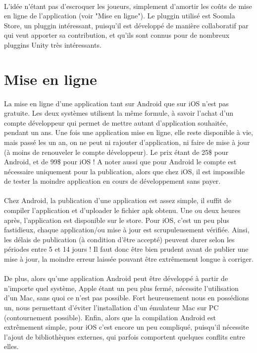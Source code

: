 \paragraph{}
L'idée n'étant pas d'escroquer les joueurs, simplement d'amortir les coûts de mise en ligne de l'application (voir "Mise en ligne"). Le pluggin utilisé est Soomla Store, un pluggin intéressant, puisqu'il est développé de manière collaboratif par qui veut apporter sa contribution, et qu'ils sont connus pour de nombreux pluggins Unity très intéressants. 

\section{Mise en ligne}

\paragraph{}
La mise en ligne d'une application tant sur Android que sur iOS n'est pas gratuite. Les deux systèmes utilisent la même formule, à savoir l'achat d'un compte développeur qui permet de mettre autant d'application souhaitée, pendant un ans. Une fois une application mise en ligne, elle reste disponible à vie, mais passé les un an, on ne peut ni rajouter d'application, ni faire de mise à jour (à moins de renouveler le compte développeur). Le prix étant de 25\$ pour Android, et de 99\$ pour iOS ! A noter aussi que pour Android le compte est nécessaire uniquement pour la publication, alors que chez iOS, il est impossible de tester la moindre application en cours de développement sans payer.

\paragraph{}
Chez Android, la publication d'une application est assez simple, il suffit de compiler l'application et d'uploader le fichier apk obtenu. Une ou deux heures après, l'application est disponible sur le store. Pour iOS, c'est un peu plus fastidieux, chaque application/ou mise à jour est scrupuleusement vérifiée. Ainsi, les délais de publication (à condition d'être accepté) peuvent durer selon les périodes entre 5 et 14 jours ! Il faut donc être bien prudent avant de publier une mise à jour, la moindre erreur laissée pouvant être extrêmement  longue à corriger. 

\paragraph{}
De plus, alors qu'une application Android peut être développé à partir de n'importe quel système, Apple étant un peu plus fermé, nécessite l'utilisation d'un Mac, sans quoi ce n'est pas possible. Fort heureusement nous en possédions un, nous permettant d'éviter l'installation d'un émulateur Mac sur PC (contournement possible). Enfin, alors que la compilation Android est extrêmement simple, pour iOS c'est encore un peu compliqué, puisqu'il nécessite l'ajout de bibliothèques externes, qui parfois comportent quelques conflits entre elles.


